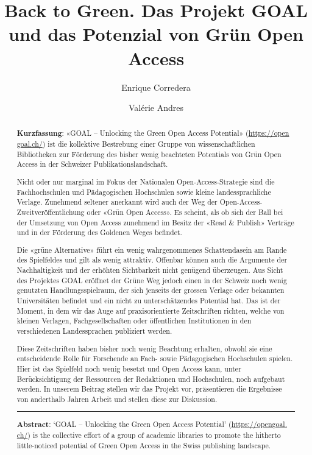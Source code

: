 \documentclass[a4paper,
fontsize=11pt,
oneside,
numbers=noperiodatend,
parskip=half-,
bibliography=totoc,
final
]{scrartcl}
\title{\LARGE{Back to Green. Das Projekt GOAL und das Potenzial von Grün Open Access}}%
\author{Enrique Corredera \and Valérie Andres} %
\date{}
\begin{document}
\maketitle
\thispagestyle{fancyplain} 

\begin{abstract}
\noindent
\textbf{Kurzfassung}: «GOAL -- Unlocking the Green Open Access
Potential» (\href{https://opengoal.ch/}{https://open goal.ch/}) ist die kollektive Bestrebung
einer Gruppe von wissenschaftlichen Bibliotheken zur Förderung des
bisher wenig beachteten Potentials von Grün Open Access in der Schweizer
Publikationslandschaft. 

Nicht oder nur marginal im Fokus der Nationalen
Open-Access-Strategie sind die Fachhochschulen und Pädagogischen
Hochschulen sowie kleine landessprachliche Verlage. Zunehmend seltener
anerkannt wird auch der Weg der Open-Access-Zweitveröffentlichung oder
«Grün Open Access». Es scheint, als ob sich der Ball bei der Umsetzung
von Open Access zunehmend im Besitz der «Read \& Publish» Verträge und
in der Förderung des Goldenen Weges befindet. 

Die «grüne Alternative»
führt ein wenig wahrgenommenes Schattendasein am Rande des Spielfeldes
und gilt als wenig attraktiv. Offenbar können auch die Argumente der
Nachhaltigkeit und der erhöhten Sichtbarkeit nicht genügend überzeugen.
Aus Sicht des Projektes GOAL eröffnet der Grüne Weg jedoch einen in der
Schweiz noch wenig genutzten Handlungsspielraum, der sich jenseits der
grossen Verlage oder bekannten Universitäten befindet und ein nicht zu
unterschätzendes Potential hat. Das ist der Moment, in dem wir das Auge
auf praxisorientierte Zeitschriften richten, welche von kleinen
Verlagen, Fachgesellschaften oder öffentlichen Institutionen in den
verschiedenen Landessprachen publiziert werden. 

Diese Zeitschriften
haben bisher noch wenig Beachtung erhalten, obwohl sie eine
entscheidende Rolle für Forschende an Fach- sowie Pädagogischen
Hochschulen spielen. Hier ist das Spielfeld noch wenig besetzt und Open
Access kann, unter Berücksichtigung der Ressourcen der Redaktionen und
Hochschulen, noch aufgebaut werden. In unserem Beitrag stellen wir das
Projekt vor, präsentieren die Ergebnisse von anderthalb Jahren Arbeit
und stellen diese zur Diskussion.

\begin{center}\rule{0.5\linewidth}{0.5pt}\end{center}

\noindent \textbf{Abstract}: \lq{}GOAL -- Unlocking the Green Open Access Potential\rq{}
(\href{https://opengoal.ch/}{https://opengoal. ch/}) is the collective effort of a group of
academic libraries to promote the hitherto little-noticed potential of
Green Open Access in the Swiss publishing landscape. 


\end{abstract}
\end{document}
